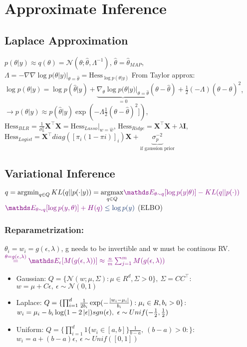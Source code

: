 \section{Approximate Inference}

\subsection{Laplace Approximation}
$p(\theta|y) \approx q(\theta) = \mathcal{N}(\theta; \hat{\theta}, \Lambda^{-1})$, 
$\hat{\theta}=\hat{\theta}_{MAP}$, 
$\Lambda = -\nabla\nabla \log p(\theta|y)|_{\theta=\hat{\theta}} = \text{Hess}_{\log p(\theta|y)}$
From Taylor approx: $\log p(\theta|y) = \log p(\hat{\theta}|y) +
\underbrace{\nabla_{\theta} \log p(\theta|y)|_{\theta=\hat{\theta}}}_{=0}(\theta - \hat{\theta}) +
\frac{1}{2} (-\Lambda) (\theta - \hat{\theta})^{2}$, 
$\rightarrow p(\theta|y) \approx p(\hat{\theta}|y) \exp(- \Lambda \frac{1}{2} (\theta - \hat{\theta})^{2}])$,
$\text{Hess}_{BLR} = \frac{1}{\sigma_{n}^{2}}\bm{X}^{\top}\bm{X} = \text{Hess}_{Lasso}|_{w=\hat{w}}$,
$\text{Hess}_{Ridge} = \bm{X}^{\top}\bm{X} + \lambda\bm{I}$,
$\text{Hess}_{Logist} = \bm{X}^{\top}diag([\pi_{i}(1-\pi{i})]_{i})\bm{X} +
\underbrace{\sigma_{p}^{-2}}_{\text{if gaussion prior}}$

\subsection{Variational Inference}
$q=\argmin_{q \in Q}KL(q||p(\cdot|y))=\underset{q\in Q}\argmax \color{violet}\E[\theta \sim q]{\log p(y|\theta)} - KL(q||p(\cdot)) \\$
$\color{violet} \E[\theta \sim q]{\log p(y,\theta)} + H(q) \color{myblue} \leq \log p(y)$ \color{violet}(ELBO)\\
\color{black}
\subsubsection{Reparametrization:}
$\theta_{i}=w_{i}= g(\epsilon, \lambda)$, g needs to be invertible and w must be continous RV.\\
$\color{violet} \overset{\theta= g(\epsilon, \lambda)}{=} \E[\epsilon]{M(g(\epsilon, \lambda))} \approx \frac{n}{m} \sum_{j=1}^{m}M(g(\epsilon, \lambda))$

\begin{itemize}
    \item
    Gaussian: $Q=\{\mathcal{N}(w; \mu, \Sigma): \mu \in R^{d}, \Sigma > 0\},\ \Sigma=CC^{\top}$:
    $w=\mu +C \epsilon,\ \epsilon \sim \mathcal{N}(0,1)$
    \item
    Laplace: $Q=\{ \prod_{i=1}^{d} \frac{1}{2b_{i}} \exp(- \frac{\left\lvert w_{i}- \mu_{i}\right\rvert}{b_{i}}): \mu_{i} \in R, b_{i}>0\}$:
    $w_{i}= \mu_{i}-b_{i}\log(1-2\left\lvert\epsilon\right\rvert)sgn(\epsilon),\ \epsilon \sim Unif(-\frac{1}{2}, \frac{1}{2})$
    \item
    Uniform: $Q=\{\prod_{i=1}^{d} 1\{w_{i} \in \left[ a,b \right] \}\frac{1}{b-a},\ (b-a)>0:\}$:
    $w_{i}= a+(b-a)\epsilon,\ \epsilon \sim Unif(\left[ 0,1 \right] )$
\end{itemize}

